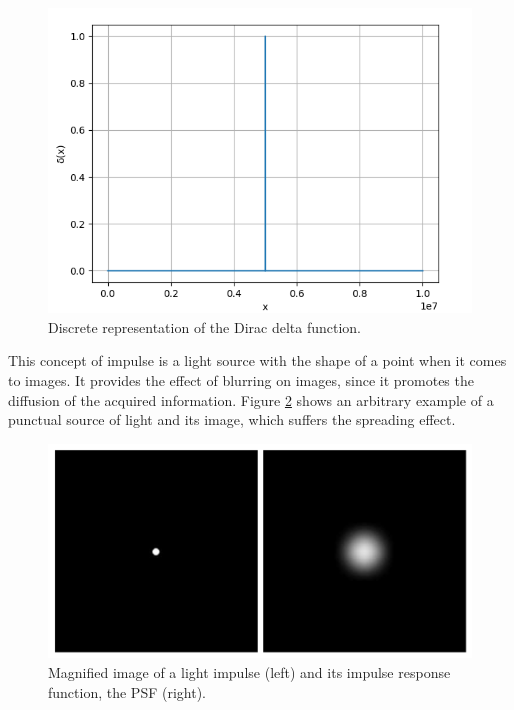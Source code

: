 \begin{figure}[H]
	\centering
	\caption{\label{fig:discrete_dirac_delta}Discrete representation of the Dirac delta function.}
	\begin{center}
	    \includegraphics[scale=0.5, trim = {0 0.6cm 0 1.5cm}]{images/fig9.png}
	\end{center}
	\centering
    \fautor
\end{figure}

This concept of impulse is a light source with the shape of a point when it comes to images. It provides the effect of blurring on images, since it promotes the diffusion of the acquired information. Figure \ref{fig:psf} shows an arbitrary example of a punctual source of light and its image, which suffers the spreading effect.

\begin{figure}[H]
	\centering
	\caption{\label{fig:psf}Magnified image of a light impulse (left) and its impulse response function, the PSF (right).}
	\begin{center}
	    \includegraphics[scale=0.4]{images/fig8.png}
	\end{center}
	\centering
\end{figure}

